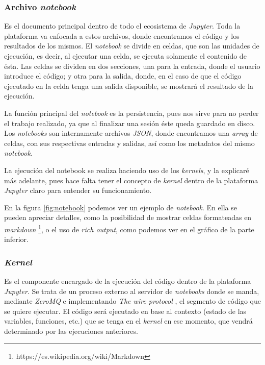 \documentclass[11pt,spanish,listoffigures]{tfgetsinf}
\begin{document}
\subsubsection{Archivo \textit{notebook}}
\label{subsec:estructura-notebook}

Es el documento principal dentro de todo el ecosistema de \textit{Jupyter}. Toda la plataforma va enfocada a estos archivos, donde encontramos el código y los resultados de los mismos. El \textit{notebook} se divide en celdas, que son las unidades de ejecución, es decir, al ejecutar una celda, se ejecuta solamente el contenido de ésta. Las celdas se dividen en dos secciones, una para la entrada, donde el usuario introduce el código; y otra para la salida, donde, en el caso de que el código ejecutado en la celda tenga una salida disponible, se mostrará el resultado de la ejecución. 

La función principal del \textit{notebook} es la persistencia, pues nos sirve para no perder el trabajo realizado, ya que al finalizar una sesión éste queda guardado en disco. Los \textit{notebooks} son internamente archivos \textit{JSON}, donde encontramos una \textit{\gls{array}} de celdas, con sus respectivas entradas y salidas, así como los metadatos del mismo \textit{notebook}.

La ejecución del notebook se realiza haciendo uso de los \textit{kernels}, y la explicaré más adelante, pues hace falta tener el concepto de \textit{kernel} dentro de la plataforma \textit{Jupyter} claro para entender su funcionamiento.

En la figura \ref{fig:notebook} podemos ver un ejemplo de \textit{notebook}. En ella se pueden apreciar detalles, como la posibilidad de mostrar celdas formateadas en \textit{markdown} \footnote{https://es.wikipedia.org/wiki/Markdown}, o el uso de \textit{rich output}, como podemos ver en el gráfico de la parte inferior.


\subsubsection{\textit{Kernel}}
\label{subsec:estructura-kernel}

Es el componente encargado de la ejecución del código dentro de la plataforma \textit{Jupyter}. Se trata de un proceso externo al servidor de \textit{notebooks} donde se manda, mediante \textit{ZeroMQ} e implementando \textit{The wire protocol} \cite{wire-protocol}, el segmento de código que se quiere ejecutar. El código será ejecutado en base al contexto (estado de las variables, funciones, etc.) que se tenga en el \textit{kernel} en ese momento, que vendrá determinado por las ejecuciones anteriores.
\end{document}
